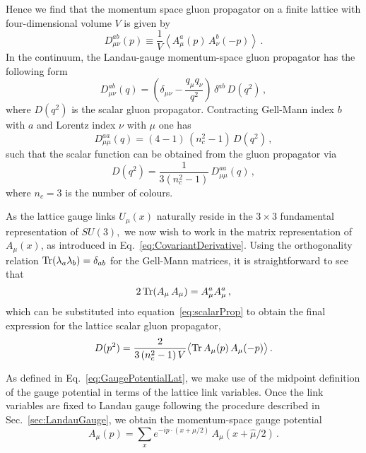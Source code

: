 Hence we find that the momentum space gluon propagator on a finite lattice with four-dimensional volume $V$ is given by
%
\begin{equation}
D_{\mu\nu}^{ab}(p) \equiv \frac{1}{V}\left \langle A^a_\mu (p)\,A^b_\nu(-p)\right\rangle \, . \label{eq:gluonProp}
\end{equation}
%
In the continuum, the Landau-gauge momentum-space gluon propagator has the following form~\cite{Leinweber:1998im,Bonnet:2001uh}
%
\begin{equation}
D^{ab}_{\mu\nu}(q) = \left ( \delta_{\mu\nu} - \frac{q_\mu q_\nu}{q^2} \right )\,\delta^{ab}\,D(q^2) \, ,
\end{equation}
%
where $D(q^2)$ is the scalar gluon propagator.  Contracting Gell-Mann index $b$ with $a$ and
Lorentz index $\nu$ with $\mu$ one has
%
\begin{equation}
D^{aa}_{\mu\mu}(q) = (4-1)\,(n_c^2-1)\,D(q^2) \, ,
\end{equation}
%
such that the scalar function can be obtained from the gluon propagator via
%
\begin{equation}
D(q^2) = \frac{1}{3(n_c^2-1)}\,D^{aa}_{\mu\mu}(q) \, ,
\label{eq:scalarProp}
\end{equation}
%
where $n_c = 3$ is the number of colours.

As the lattice gauge links $U_\mu(x)$ naturally reside in the $3\times 3$ fundamental representation of $SU(3),$ we now wish to work in the matrix representation of $A_\mu(x)$, as introduced in Eq.~\ref{eq:CovariantDerivative}. Using the orthogonality relation $\operatorname{Tr}(\lambda_a\lambda_b) = \delta_{ab}$ for the Gell-Mann matrices, it is straightforward to see that
%
\begin{equation}
2\operatorname{Tr}(A_\mu\,A_\mu) = A^a_\mu A^a_\mu\, ,
\end{equation}
%
which can be substituted into equation~\ref{eq:scalarProp} to obtain the final expression for the lattice scalar gluon propagator,
%
\begin{equation}
D(p^2) = \frac{2}{3\,(n_c^2-1)\,V}\big\langle {\rm Tr}\, A_\mu(p)\,A_\mu(-p) \big\rangle \,. \label{eq:scalarProp2}
\end{equation}

As defined in Eq.~\ref{eq:GaugePotentialLat}, we make use of the midpoint definition of the gauge potential in terms of the lattice link variables. Once the link variables are fixed to Landau gauge following the procedure described in Sec.~\ref{sec:LandauGauge}, we obtain the momentum-space gauge potential
%
\begin{equation}
A_\mu(p) = \sum_x e^{-ip\cdot(x+\hat{\mu}/2)}\, A_\mu(x+\hat{\mu}/2)\, .
\end{equation}

